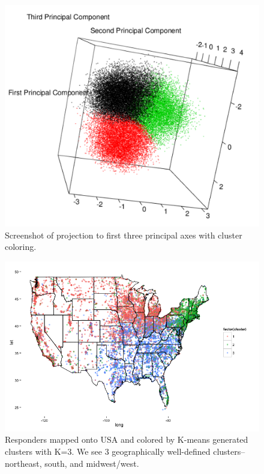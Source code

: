 \documentclass[english]{article}\usepackage{graphicx, color}
\numberwithin{equation}{section}
\numberwithin{figure}{section}
\begin{document}
\begin{figure}
\begin{center}
\includegraphics[scale = .4]{PCA3DScatter.png}
\caption{Screenshot of projection to first three principal axes with cluster coloring.}
\end{center}
\end{figure}

\begin{figure}
\begin{center}
\includegraphics[scale=.5]{clusters.png}
\end{center}
\caption{Responders mapped onto USA and colored by K-means generated clusters with K=3. We see 3 geographically well-defined clusters--northeast, south, and midwest/west.}
\end{figure}
\end{document}
